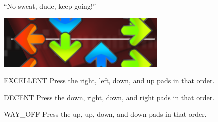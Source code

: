 ``No sweat, dude, keep going!''

\begin{center}
  \includegraphics{itg-rldu.png}
\end{center}

\begin{switch}
\item{EXCELLENT}
  Press the right, left, down, and up pads in that order.
\item{DECENT}
  Press the down, right, down, and right pads in that order.
\item{WAY\_OFF}
  Press the up, up, down, and down pads in that order.
\end{switch}


